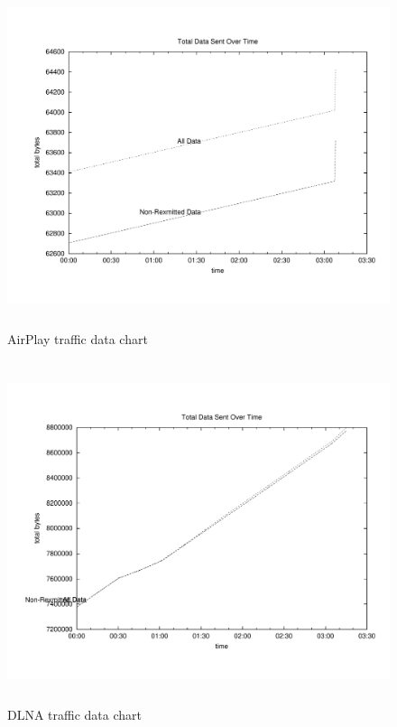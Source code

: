\begin{figure}[htb]
\centering \includegraphics[height=10cm]{charts/airplay_traffic_data}
\caption{AirPlay traffic data chart \label{chart6}}
\end{figure}
\begin{figure}[htb]
\centering \includegraphics[height=10cm]{charts/dlna_traffic_data}
\caption{DLNA traffic data chart \label{chart6}}
\end{figure}

